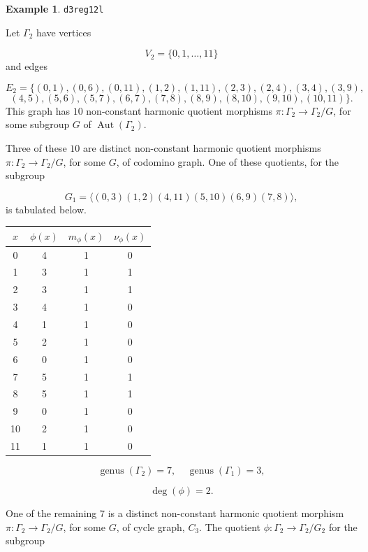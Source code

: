 \documentclass[12pt,letterpaper]{article}
\theoremstyle{definition}
\newtheorem{example}[theorem]{Example}
\DeclareMathOperator{\Aut}{Aut}
\DeclareMathOperator{\genus}{genus}
\begin{document}
\begin{example}%
\label{example:d3reg12l}
  {\tt d3reg12l}\newline
{\rm  
Let $\Gamma_2$ have vertices

\[
V_2=\{0,1,\dots,11\}
\]
and edges

\[
E_2 = \{
(0, 1), (0, 6), (0, 11), (1, 2), (1, 11), (2, 3), (2, 4), (3, 4), (3, 9),
\]
\[
(4, 5), (5, 6), (5, 7), (6, 7), (7, 8), (8, 9), (8, 10), (9, 10), (10, 11)
\}.
\]
This graph has $10$ non-constant harmonic quotient
morphisms $\pi: \Gamma_2\to \Gamma_2/G$, for some subgroup
$G$ of $\Aut(\Gamma_2)$.

Three of these $10$ are distinct non-constant harmonic quotient
morphisms $\pi: \Gamma_2\to \Gamma_2/G$, for some $G$, of
codomino graph.
One of these quotients, for the subgroup

\[
G_1=\langle (0,3)(1,2)(4,11)(5,10)(6,9)(7,8) \rangle,
\]
is tabulated below.

\begin{center}
\begin{tabular}{c|c|c|c}  
  $x$ & $\phi(x)$ & $m_\phi(x)$ & $\nu_\phi(x)$ \\ \hline
  0   &    4   &        1         &  0   \\ 
  1   &    3   &        1         &  1  \\ 
  2   &    3   &        1         &  1  \\ 
  3   &    4   &        1         &  0  \\ 
  4   &    1   &        1         &  0   \\ 
  5   &    2   &        1         &  0    \\ 
  6   &    0   &        1         &  0   \\ 
  7   &    5   &        1         &  1   \\
  8   &    5   &        1         &  1   \\
  9   &    0   &        1         &  0   \\
  10  &    2   &        1         &  0   \\
  11  &    1   &        1         &  0   \\ 
\end{tabular}
\end{center}

\[
  \genus(\Gamma_2) =7,\ \ \ \ \
  \genus(\Gamma_1) =3,
\]

\[
\deg(\phi) =2.
\]

One of the remaining $7$ is a distinct non-constant harmonic quotient
morphism $\pi: \Gamma_2\to \Gamma_2/G$, for some $G$, of
cycle graph, $C_3$.
The quotient $\phi: \Gamma_2\to \Gamma_2/G_2$ for the subgroup

}
\end{example}
\end{document}
